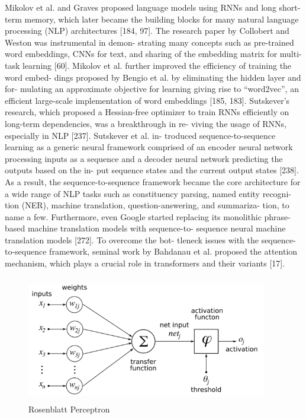 Mikolov et al. and Graves proposed language models using RNNs
and long short-term memory, which later became the building blocks for
many natural language processing (NLP) architectures [184, 97]. The
research paper by Collobert and Weston was instrumental in demon-
strating many concepts such as pre-trained word embeddings, CNNs for
text, and sharing of the embedding matrix for multi-task learning [60].
Mikolov et al. further improved the efficiency of training the word embed-
dings proposed by Bengio et al. by eliminating the hidden layer and for-
mulating an approximate objective for learning giving rise to “word2vec”,
an efficient large-scale implementation of word embeddings [185, 183].
Sutskever’s research, which proposed a Hessian-free optimizer to train
RNNs efficiently on long-term dependencies, was a breakthrough in re-
viving the usage of RNNs, especially in NLP [237]. Sutskever et al. in-
troduced sequence-to-sequence learning as a generic neural framework
comprised of an encoder neural network processing inputs as a sequence
and a decoder neural network predicting the outputs based on the in-
put sequence states and the current output states [238]. As a result, the
sequence-to-sequence framework became the core architecture for a wide
range of NLP tasks such as constituency parsing, named entity recogni-
tion (NER), machine translation, question-answering, and summariza-
tion, to name a few. Furthermore, even Google started replacing its monolithic phrase-based machine translation models with sequence-to-
sequence neural machine translation models [272]. To overcome the bot-
tleneck issues with the sequence-to-sequence framework, seminal work
by Bahdanau et al. proposed the attention mechanism, which plays a
crucial role in transformers and their variants [17].

\begin{figure}[ht]
\includegraphics[width=10.5cm, height=5.5cm]{images/Rosenblattperceptron.png}
\centering
\caption{Rosenblatt Perceptron}
\label{fig:resenblatt-perceptron}
\end{figure}

